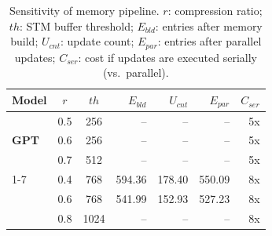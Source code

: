 \begin{table}[htbp]
\centering
\small
\caption{Sensitivity of memory pipeline. 
$r$: compression ratio; $th$: STM buffer threshold; 
$E_{bld}$: entries after memory build; 
$U_{cnt}$: update count; 
$E_{par}$: entries after parallel updates; 
$C_{ser}$: cost if updates are executed serially (vs.\ parallel).}
\vspace{1ex}
\label{tab:mem-abbrev}
\begin{tabular}{@{}l c c r r r r@{}}
\toprule
Model & $r$ & $th$ & $E_{bld}$ & $U_{cnt}$ & $E_{par}$ & $C_{ser}$ \\
\midrule
\multirow{3}{*}{\textbf{GPT}}
 & 0.5 & 256  & --     & --     & --     & 5x \\
 & 0.6 & 256  & --     & --     & --     & 5x\\
 & 0.7 & 512  & --     & --     & --     & 5x \\
\cmidrule(lr){1-7}
\multirow{3}{*}{\textbf{Qwen}}
 & 0.4 & 768  & 594.36 & 178.40 & 550.09 & 8x \\
 & 0.6 & 768  & 541.99 & 152.93 & 527.23 & 8x \\
 & 0.8 & 1024 & --     & --     & --     & 8x \\
\bottomrule
\end{tabular}
\end{table}
